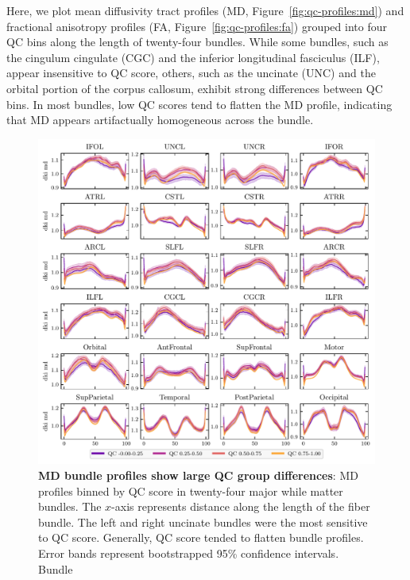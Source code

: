\documentclass[fleqn,10pt,inline]{wlscirep}
\begin{document}
Here, we plot mean diffusivity tract profiles (MD, Figure~\ref{fig:qc-profiles:md}) and fractional anisotropy profiles (FA, Figure~\ref{fig:qc-profiles:fa}) grouped
into four QC bins along the length of twenty-four bundles. While some bundles,
such as the cingulum cingulate (CGC) and the inferior longitudinal fasciculus
(ILF), appear insensitive to QC score, others, such as the uncinate (UNC) and
the orbital portion of the corpus callosum, exhibit strong differences between
QC bins. In most bundles, low QC scores tend to flatten the MD profile, indicating that MD appears artifactually homogeneous across the bundle.

\begin{figure}[tbp]
    \centering
    \includegraphics[width=\linewidth]{qc-bins-dki-md.pdf}
    \caption{%
        {\bf MD bundle profiles show large QC group differences}:
        MD profiles binned by QC score in twenty-four major while matter
        bundles.  The $x$-axis represents distance along the length of the fiber
        bundle.
        The left and right uncinate bundles were the most sensitive
        to QC score. Generally, QC score tended to flatten bundle profiles.
        Error bands represent bootstrapped 95\% confidence intervals. Bundle
}
\end{figure}
\end{document}
